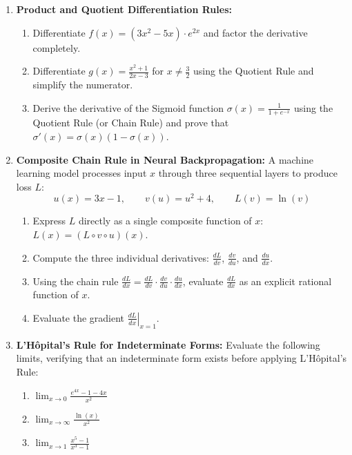 \begin{enumerate}
    \item \textbf{Product and Quotient Differentiation Rules:}
    \begin{enumerate}
        \item Differentiate $f(x) = (3x^2 - 5x) \cdot e^{2x}$ and factor the derivative completely.
        \item Differentiate $g(x) = \frac{x^2 + 1}{2x - 3}$ for $x \neq \frac{3}{2}$ using the Quotient Rule and simplify the numerator.
        \item Derive the derivative of the Sigmoid function $\sigma(x) = \frac{1}{1 + e^{-x}}$ using the Quotient Rule (or Chain Rule) and prove that $\sigma'(x) = \sigma(x)(1 - \sigma(x))$.
    \end{enumerate}

    \item \textbf{Composite Chain Rule in Neural Backpropagation:} A machine learning model processes input $x$ through three sequential layers to produce loss $L$:
    $$u(x) = 3x - 1, \qquad v(u) = u^2 + 4, \qquad L(v) = \ln(v)$$
    \begin{enumerate}
        \item Express $L$ directly as a single composite function of $x$: $L(x) = (L \circ v \circ u)(x)$.
        \item Compute the three individual derivatives: $\frac{dL}{dv}$, $\frac{dv}{du}$, and $\frac{du}{dx}$.
        \item Using the chain rule $\frac{dL}{dx} = \frac{dL}{dv} \cdot \frac{dv}{du} \cdot \frac{du}{dx}$, evaluate $\frac{dL}{dx}$ as an explicit rational function of $x$.
        \item Evaluate the gradient $\left.\frac{dL}{dx}\right|_{x = 1}$.
    \end{enumerate}

    \item \textbf{L'Hôpital's Rule for Indeterminate Forms:} Evaluate the following limits, verifying that an indeterminate form exists before applying L'Hôpital's Rule:
    \begin{enumerate}
        \item $\lim_{x \to 0} \frac{e^{4x} - 1 - 4x}{x^2}$
        \item $\lim_{x \to \infty} \frac{\ln(x)}{x^2}$
        \item $\lim_{x \to 1} \frac{x^5 - 1}{x^3 - 1}$
    \end{enumerate}


\end{enumerate}
